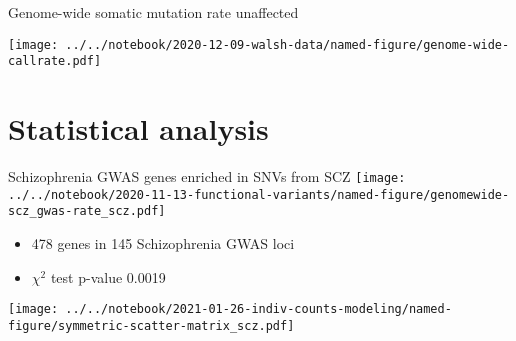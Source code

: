 \documentclass[usenames,dvipsnames]{beamer}
\begin{document}

\begin{frame}{Genome-wide somatic mutation rate unaffected}
\begin{center}
\texttt{[image: ../../notebook/2020-12-09-walsh-data/named-figure/genome-wide-callrate.pdf]}
\end{center}
\end{frame}

\section{Statistical analysis}

\begin{frame}{Schizophrenia GWAS genes enriched in SNVs from SCZ}
\texttt{[image: ../../notebook/2020-11-13-functional-variants/named-figure/genomewide-scz\_gwas-rate\_scz.pdf]}
\begin{itemize}
\item 478 genes in 145 Schizophrenia GWAS loci
\item \(\chi^2\) test p-value 0.0019
\end{itemize}
\end{frame}

\begin{frame}
\texttt{[image: ../../notebook/2021-01-26-indiv-counts-modeling/named-figure/symmetric-scatter-matrix\_scz.pdf]}
\end{frame}
\end{document}
